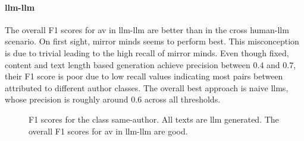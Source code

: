 \paragraph{\ac{llm}-\ac{llm}}
The overall F1 scores for \ac{av} in \ac{llm}-\ac{llm} are better than in the cross human-\ac{llm} scenario.
On first sight, mirror minds seems to perform best.
This misconception is due to trivial \imps{} leading to the high recall of mirror minds.
Even though fixed, content and text length based \imp{} generation achieve precision between $0.4$ and $0.7$, their F1 score is poor due to low recall values indicating most pairs between attributed to different author classes.
The overall best approach is \ac{naive} \acp{llm}, whose precision is roughly around $0.6$ across all thresholds.


  \begin{figure}[b]
    \centering
    
    \caption{F1 scores for the class same-author.
  All texts are \ac{llm} generated.
  The overall F1 scores for \ac{av} in \ac{llm}-\ac{llm} are good.
  }
    \label{fig:llm-llm_f1}
  \end{figure}


